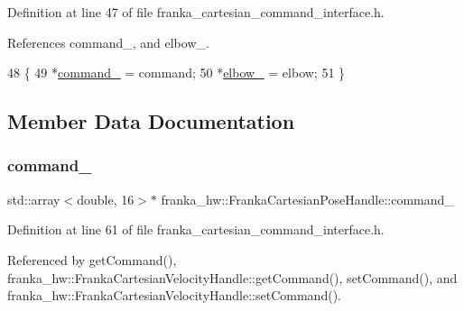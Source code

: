 Definition at line 47 of file franka\+\_\+cartesian\+\_\+command\+\_\+interface.\+h.



References command\+\_\+, and elbow\+\_\+.


\begin{DoxyCode}
48                                                              \{
49     *\hyperlink{classfranka__hw_1_1FrankaCartesianPoseHandle_a241d690f13da4ef26f80e893072e9584}{command\_} = command;
50     *\hyperlink{classfranka__hw_1_1FrankaCartesianPoseHandle_a24d9028a55a8a3bae39c9972c21e009f}{elbow\_} = elbow;
51   \}
\end{DoxyCode}


\subsection{Member Data Documentation}
\mbox{\label{classfranka__hw_1_1FrankaCartesianPoseHandle_a241d690f13da4ef26f80e893072e9584}} 
\subsubsection{\texorpdfstring{command\+\_\+}{command\_}}
{\footnotesize\ttfamily std\+::array$<$double, 16$>$$\ast$ franka\+\_\+hw\+::\+Franka\+Cartesian\+Pose\+Handle\+::command\+\_\+\hspace{0.3cm}{\ttfamily [private]}}



Definition at line 61 of file franka\+\_\+cartesian\+\_\+command\+\_\+interface.\+h.



Referenced by get\+Command(), franka\+\_\+hw\+::\+Franka\+Cartesian\+Velocity\+Handle\+::get\+Command(), set\+Command(), and franka\+\_\+hw\+::\+Franka\+Cartesian\+Velocity\+Handle\+::set\+Command().

\mbox{\label{classfranka__hw_1_1FrankaCartesianPoseHandle_a24d9028a55a8a3bae39c9972c21e009f}} 
